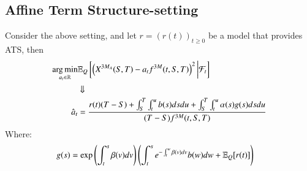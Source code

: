 \newpage 

\subsection{Affine Term Structure-setting}

\begin{proposition}
Consider the above setting, and let $r = (r(t))_{t\geq 0}$ be a model that provides ATS, then 
\begin{align*}
\operatorname*{arg\,min}\limits_{a_{t} \in \mathbb{R}}&\mathbb{E}_{Q}\left[
\left(
X^{3M_{A}}(S,T)- a_{t}f^{3M}(t,S,T)
\right)^{2}
\bigg{|}\mathcal{F}_{t}
\right] \\
&\Downarrow \\
\hat{a}_{t} &= \frac{
r(t)(T-S)
+ \int_{S}^{T}\int_{t}^{u}b(s)dsdu 
+ \int_{S}^{T}\int_{t}^{u}\alpha(s)g(s)dsdu
}{
(T-S)f^{3M}(t,S,T)
}
\end{align*}
Where:
\begin{align*}
g(s) &= \exp\left(
\int_{t}^{s}\beta(v)dv
\right)
\left(
\int_{t}^{s}e^{-\int_{t}^{w}\beta(v)dv}b(w)dw + \mathbb{E}_{Q}[r(t)]
\right) 
\end{align*}
\end{proposition}

